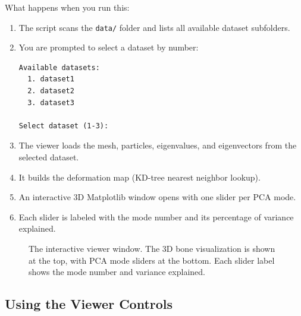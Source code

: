 \documentclass[12pt,a4paper]{article}
\begin{document}
What happens when you run this:

\begin{enumerate}[itemsep=0.5em]
    \item The script scans the \texttt{data/} folder and lists all available dataset subfolders.
    \item You are prompted to select a dataset by number:
    \begin{lstlisting}[numbers=none]
Available datasets:
  1. dataset1
  2. dataset2
  3. dataset3

Select dataset (1-3):
    \end{lstlisting}
    \item The viewer loads the mesh, particles, eigenvalues, and eigenvectors from the selected dataset.
    \item It builds the deformation map (KD-tree nearest neighbor lookup).
    \item An interactive 3D Matplotlib window opens with one slider per PCA mode.
    \item Each slider is labeled with the mode number and its percentage of variance explained.
\end{enumerate}

\begin{figure}[H]
    \centering
    \caption{The interactive viewer window. The 3D bone visualization is shown at the top, with PCA mode sliders at the bottom. Each slider label shows the mode number and variance explained.}
    \label{fig:viewer_screenshot}
\end{figure}

\subsection{Using the Viewer Controls}
\end{document}
